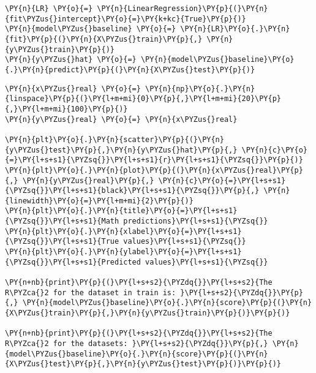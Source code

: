     \begin{tcolorbox}[breakable, size=fbox, boxrule=1pt, pad at break*=1mm,colback=cellbackground, colframe=cellborder]
\begin{Verbatim}[commandchars=\\\{\}]
\PY{n}{LR} \PY{o}{=} \PY{n}{LinearRegression}\PY{p}{(}\PY{n}{fit\PYZus{}intercept}\PY{o}{=}\PY{k+kc}{True}\PY{p}{)}
\PY{n}{model\PYZus{}baseline} \PY{o}{=} \PY{n}{LR}\PY{o}{.}\PY{n}{fit}\PY{p}{(}\PY{n}{X\PYZus{}train}\PY{p}{,} \PY{n}{y\PYZus{}train}\PY{p}{)}
\PY{n}{y\PYZus{}hat} \PY{o}{=} \PY{n}{model\PYZus{}baseline}\PY{o}{.}\PY{n}{predict}\PY{p}{(}\PY{n}{X\PYZus{}test}\PY{p}{)}
\end{Verbatim}
\end{tcolorbox}

    \begin{tcolorbox}[breakable, size=fbox, boxrule=1pt, pad at break*=1mm,colback=cellbackground, colframe=cellborder]
\begin{Verbatim}[commandchars=\\\{\}]
\PY{n}{x\PYZus{}real} \PY{o}{=} \PY{n}{np}\PY{o}{.}\PY{n}{linspace}\PY{p}{(}\PY{l+m+mi}{0}\PY{p}{,}\PY{l+m+mi}{20}\PY{p}{,}\PY{l+m+mi}{100}\PY{p}{)}
\PY{n}{y\PYZus{}real} \PY{o}{=} \PY{n}{x\PYZus{}real}

\PY{n}{plt}\PY{o}{.}\PY{n}{scatter}\PY{p}{(}\PY{n}{y\PYZus{}test}\PY{p}{,}\PY{n}{y\PYZus{}hat}\PY{p}{,} \PY{n}{c}\PY{o}{=}\PY{l+s+s1}{\PYZsq{}}\PY{l+s+s1}{r}\PY{l+s+s1}{\PYZsq{}}\PY{p}{)}
\PY{n}{plt}\PY{o}{.}\PY{n}{plot}\PY{p}{(}\PY{n}{x\PYZus{}real}\PY{p}{,} \PY{n}{y\PYZus{}real}\PY{p}{,} \PY{n}{c}\PY{o}{=}\PY{l+s+s1}{\PYZsq{}}\PY{l+s+s1}{black}\PY{l+s+s1}{\PYZsq{}}\PY{p}{,} \PY{n}{linewidth}\PY{o}{=}\PY{l+m+mi}{2}\PY{p}{)}
\PY{n}{plt}\PY{o}{.}\PY{n}{title}\PY{o}{=}\PY{l+s+s1}{\PYZsq{}}\PY{l+s+s1}{Math predictions}\PY{l+s+s1}{\PYZsq{}}
\PY{n}{plt}\PY{o}{.}\PY{n}{xlabel}\PY{o}{=}\PY{l+s+s1}{\PYZsq{}}\PY{l+s+s1}{True values}\PY{l+s+s1}{\PYZsq{}}
\PY{n}{plt}\PY{o}{.}\PY{n}{ylabel}\PY{o}{=}\PY{l+s+s1}{\PYZsq{}}\PY{l+s+s1}{Predicted values}\PY{l+s+s1}{\PYZsq{}}

\PY{n+nb}{print}\PY{p}{(}\PY{l+s+s2}{\PYZdq{}}\PY{l+s+s2}{The R\PYZca{}2 for the dataset in train is: }\PY{l+s+s2}{\PYZdq{}}\PY{p}{,} \PY{n}{model\PYZus{}baseline}\PY{o}{.}\PY{n}{score}\PY{p}{(}\PY{n}{X\PYZus{}train}\PY{p}{,}\PY{n}{y\PYZus{}train}\PY{p}{)}\PY{p}{)}

\PY{n+nb}{print}\PY{p}{(}\PY{l+s+s2}{\PYZdq{}}\PY{l+s+s2}{The R\PYZca{}2 for the datasets: }\PY{l+s+s2}{\PYZdq{}}\PY{p}{,} \PY{n}{model\PYZus{}baseline}\PY{o}{.}\PY{n}{score}\PY{p}{(}\PY{n}{X\PYZus{}test}\PY{p}{,}\PY{n}{y\PYZus{}test}\PY{p}{)}\PY{p}{)}
\end{Verbatim}
\end{tcolorbox}

